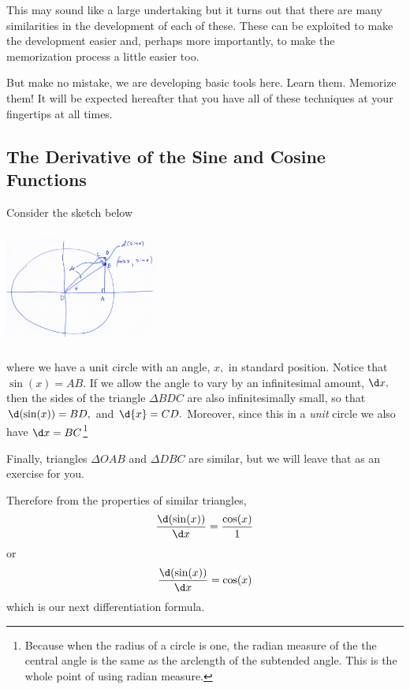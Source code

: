 This may sound like a large undertaking but it turns out that there
are many similarities in the development of each of these. These can
be exploited to make the development easier and, perhaps more
importantly, to make the memorization process a little easier too.

But make no mistake, we are developing basic tools here. Learn
them. {\sc{}Memorize them!} It will be expected hereafter that you have all
of these techniques at your fingertips at all times.

\setcounter{myexample}{0}
\subsection{The Derivative of the Sine and Cosine Functions}
\label{subsec:diff-sine-funt}
Consider the sketch below\\
\centerline{ \includegraphics*[height=1.5in,width=2in]{Figures-HandDrawn/DiffSin}}
where we have a unit circle with an angle, \(x,\) in standard
position. Notice that $\sin(x) = AB.$ If we allow the angle to vary by
an infinitesimal amount, $\d x,$ then the sides of the triangle
$\Delta BDC$ are also infinitesimally small, so that $\d(\sin(x)) =
BD,$ and $\d{x}=CD.$ Moreover, since this in a \emph{unit} circle we
also have $\d x = BC$\footnote{Because when the radius of a circle is
  one, the radian measure of the the central angle is the same as the
  arclength of the subtended angle. This is the whole point of using
  radian measure.}  
\begin{embeddedproblem}{}
  Finally, triangles $\Delta OAB$ and $\Delta DBC$ are similar, but we
  will leave that as an exercise for you.
\end{embeddedproblem}
Therefore from the properties of similar
triangles,
\[
\frac{\d(\sin(x))}{\d x} = \frac{\cos(x)}{1}
\]
or \[\frac{\d(\sin(x))}{\d x} = \cos(x)\]
 which is  our next differentiation formula.


